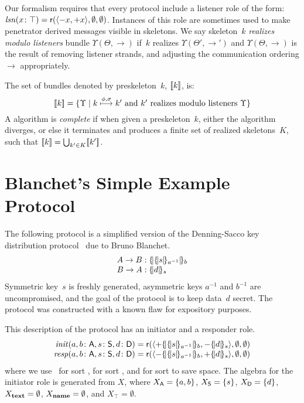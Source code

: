 \documentclass[12pt]{report}
\theoremstyle{definition}
\newcommand{\role}{\mathsf{r}}
\newcommand{\lsn}{\fn{lsn}}
\newcommand{\init}{\fn{init}}
\newcommand{\resp}{\fn{resp}}
\begin{document}
Our formalism requires that every protocol include a
listener\label{def:listeners} role of the form:
$\lsn(x\colon\top)=\role(\seq{\inbnd x,\outbnd
  x},\emptyset,\emptyset)$.  Instances of this role are sometimes used
to make penetrator derived messages visible in skeletons.  We say
skeleton~$k$ \emph{realizes modulo listeners} bundle
$\Upsilon(\Theta,\to) $ if~$k$ realizes $\Upsilon(\Theta',\to')$ and
\hbox{$\Upsilon(\Theta,\to)$} is the result of removing listener
strands, and adjusting the communication ordering $\to$ appropriately.

The set of bundles denoted by preskeleton~$k$, $[\![k]\!]$, is:
$$[\![k]\!] = \{\Upsilon\mid
\mbox{$k\stackrel{\phi,\sigma}{\longmapsto}k'$ and $k'$ realizes modulo
  listeners $\Upsilon$}\}$$ A {\cpsa} algorithm is \emph{complete} if
when given a preskeleton~$k$, either the algorithm diverges, or else it
terminates and produces a finite set of realized skeletons~$K$, such
that $[\![k]\!]=\bigcup_{k'\in K}[\![k']\!]$.
\label{def:preskeleton denotation}

\section{Blanchet's Simple Example Protocol}\label{sec:blanchet's
  simple example protocol}

The following protocol is a simplified version of the Denning-Sacco
key distribution protocol~\cite{DenningSacco81} due to Bruno Blanchet.
$$\begin{array}{r@{{}:{}}l}
A\to B&\enc{\enc{s}{a^{-1}}}{b}\\
B\to A&\enc{d}{s}
\end{array}$$
Symmetric key~$s$ is freshly generated, asymmetric keys $a^{-1}$ and
$b^{-1}$ are uncompromised, and the goal of the protocol is to keep
data~$d$ secret.  The protocol was constructed with a known flaw for
expository purposes.

This {\cpsa} description of the protocol has an initiator and a
responder role.
$$\begin{array}{r@{{}={}}l}
\init(a,b\colon\srt{A},s\colon\srt{S}, d\colon\srt{D})&
\role(\seq{\outbnd\enc{\enc{s}{a^{-1}}}{b},\inbnd\enc{d}{s}},
\emptyset,\emptyset)\\
\resp(a,b\colon\srt{A},s\colon\srt{S}, d\colon\srt{D})&
\role(\seq{\inbnd\enc{\enc{s}{a^{-1}}}{b},\outbnd\enc{d}{s}},
\emptyset,\emptyset)
\end{array}$$
where we use~ for sort ,  for sort , and
 for sort  to save space.  The algebra for the initiator
role is generated from $X$, where $X_{\mathsf{A}}=\{a,b\}$, $X_{\mathsf{S}}=\{s\}$,
$X_{\mathsf{D}}=\{d\}$, $X_{\operatorname{\mathbf{text}}}=\emptyset$, $X_{\operatorname{\mathbf{name}}}=\emptyset$,
and $X_\top=\emptyset$.
\end{document}
